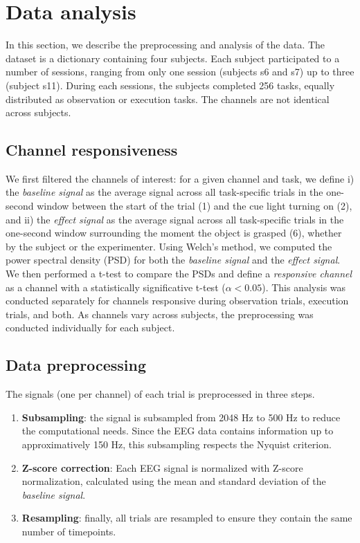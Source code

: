 \documentclass[10pt,conference,compsocconf]{IEEEtran}
\begin{document}
\section{Data analysis}
\label{sec:analysis}
In this section, we describe the preprocessing and analysis of the data. The dataset is a dictionary containing four subjects. Each subject participated to a number of sessions, ranging from only one session (subjects s6 and s7) up to three (subject s11). During each sessions, the subjects completed 256 tasks, equally distributed as observation or execution tasks. The channels are not identical across subjects.

\subsection{Channel responsiveness}
We first filtered the channels of interest: for a given channel and task, we define i) the \textit{baseline signal} as the average signal across all task-specific trials in the one-second window between the start of the trial (1) and the cue light turning on (2), and ii) the \textit{effect signal} as the average signal across all task-specific trials in the one-second window surrounding the moment the object is grasped (6), whether by the subject or the experimenter. Using Welch's method\cite{welch}, we computed the power spectral density (PSD) for both the \textit{baseline signal} and the \textit{effect signal}. We then performed a t-test to compare the PSDs and define a \textit{responsive channel} as a channel with a statistically significative t-test (\(\alpha<0.05\)). This analysis was conducted separately for channels responsive during observation trials, execution trials, and both. As channels vary across subjects, the preprocessing was conducted individually for each subject.

\subsection{Data preprocessing}
The signals (one per channel) of each trial is preprocessed in three steps.
\begin{enumerate}
  \item \textbf{Subsampling}: the signal is subsampled from 2048 Hz to 500 Hz to reduce the computational needs. Since the EEG data contains information up to approximatively 150 Hz, this subsampling respects the Nyquist criterion.
  \item \textbf{Z-score correction}: Each EEG signal is normalized with Z-score normalization, calculated using the mean and standard deviation of the \textit{baseline signal}.
  \item \textbf{Resampling}: finally, all trials are resampled to ensure they contain the same number of timepoints.
\end{enumerate}
\end{document}
